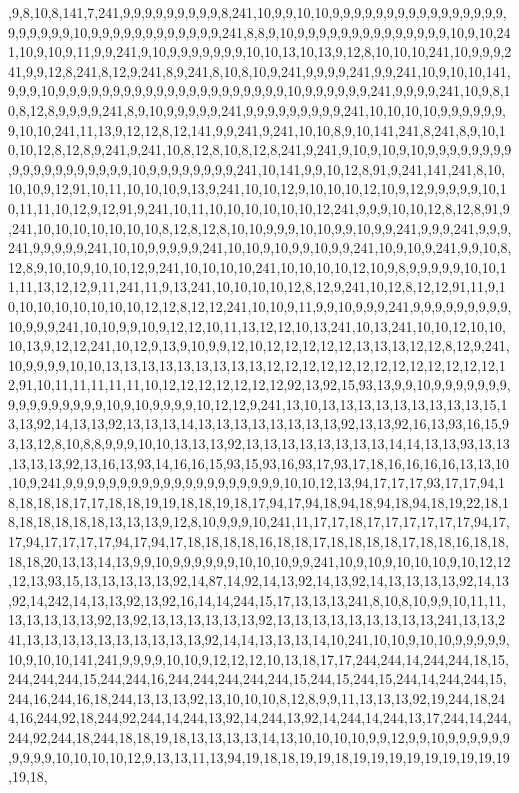 ,9,8,10,8,141,7,241,9,9,9,9,9,9,9,9,9,8,241,10,9,9,10,10,9,9,9,9,9,9,9,9,9,9,9,9,9,9,9,9,9,9,9,9,9,9,10,9,9,9,9,9,9,9,9,9,9,9,9,241,8,8,9,10,9,9,9,9,9,9,9,9,9,9,9,9,9,9,10,9,10,241,10,9,10,9,11,9,9,241,9,10,9,9,9,9,9,9,9,10,10,13,10,13,9,12,8,10,10,10,241,10,9,9,9,241,9,9,12,8,241,8,12,9,241,8,9,241,8,10,8,10,9,241,9,9,9,9,241,9,9,241,10,9,10,10,141,9,9,9,10,9,9,9,9,9,9,9,9,9,9,9,9,9,9,9,9,9,9,9,9,9,10,9,9,9,9,9,9,241,9,9,9,9,241,10,9,8,10,8,12,8,9,9,9,9,241,8,9,10,9,9,9,9,9,241,9,9,9,9,9,9,9,9,9,241,10,10,10,10,9,9,9,9,9,9,9,10,10,241,11,13,9,12,12,8,12,141,9,9,241,9,241,10,10,8,9,10,141,241,8,241,8,9,10,10,10,12,8,12,8,9,241,9,241,10,8,12,8,10,8,12,8,241,9,241,9,10,9,10,9,10,9,9,9,9,9,9,9,9,9,9,9,9,9,9,9,9,9,9,9,10,9,9,9,9,9,9,9,9,241,10,141,9,9,10,12,8,91,9,241,141,241,8,10,10,10,9,12,91,10,11,10,10,10,9,13,9,241,10,10,12,9,10,10,10,12,10,9,12,9,9,9,9,9,10,10,11,11,10,12,9,12,91,9,241,10,11,10,10,10,10,10,10,12,241,9,9,9,10,10,12,8,12,8,91,9,241,10,10,10,10,10,10,10,8,12,8,12,8,10,10,9,9,9,10,10,9,9,10,9,9,241,9,9,9,241,9,9,9,241,9,9,9,9,9,241,10,10,9,9,9,9,9,241,10,10,9,10,9,9,10,9,9,241,10,9,10,9,241,9,9,10,8,12,8,9,10,10,9,10,10,12,9,241,10,10,10,10,241,10,10,10,10,12,10,9,8,9,9,9,9,9,10,10,11,11,13,12,12,9,11,241,11,9,13,241,10,10,10,10,12,8,12,9,241,10,12,8,12,12,91,11,9,10,10,10,10,10,10,10,10,12,12,8,12,12,241,10,10,9,11,9,9,10,9,9,9,241,9,9,9,9,9,9,9,9,9,10,9,9,9,241,10,10,9,9,10,9,12,12,10,11,13,12,12,10,13,241,10,13,241,10,10,12,10,10,10,13,9,12,12,241,10,12,9,13,9,10,9,9,12,10,12,12,12,12,12,13,13,13,12,12,8,12,9,241,10,9,9,9,9,10,10,13,13,13,13,13,13,13,13,13,12,12,12,12,12,12,12,12,12,12,12,12,12,12,91,10,11,11,11,11,11,10,12,12,12,12,12,12,12,92,13,92,15,93,13,9,9,10,9,9,9,9,9,9,9,9,9,9,9,9,9,9,9,9,10,9,10,9,9,9,9,10,12,12,9,241,13,10,13,13,13,13,13,13,13,13,13,15,13,13,92,14,13,13,92,13,13,13,14,13,13,13,13,13,13,13,13,92,13,13,92,16,13,93,16,15,93,13,12,8,10,8,8,9,9,9,10,10,13,13,13,92,13,13,13,13,13,13,13,13,14,14,13,13,93,13,13,13,13,13,92,13,16,13,93,14,16,16,15,93,15,93,16,93,17,93,17,18,16,16,16,16,13,13,10,10,9,241,9,9,9,9,9,9,9,9,9,9,9,9,9,9,9,9,9,9,9,9,10,10,12,13,94,17,17,17,93,17,17,94,18,18,18,18,17,17,18,18,19,19,18,18,19,18,17,94,17,94,18,94,18,94,18,94,18,19,22,18,18,18,18,18,18,18,13,13,13,9,12,8,10,9,9,9,10,241,11,17,17,18,17,17,17,17,17,17,94,17,17,94,17,17,17,17,94,17,94,17,18,18,18,18,16,18,18,17,18,18,18,18,17,18,18,16,18,18,18,18,20,13,13,14,13,9,9,10,9,9,9,9,9,9,10,10,10,9,9,241,10,9,10,9,10,10,10,9,10,12,12,12,13,93,15,13,13,13,13,13,92,14,87,14,92,14,13,92,14,13,92,14,13,13,13,13,92,14,13,92,14,242,14,13,13,92,13,92,16,14,14,244,15,17,13,13,13,241,8,10,8,10,9,9,10,11,11,13,13,13,13,13,92,13,92,13,13,13,13,13,13,92,13,13,13,13,13,13,13,13,13,241,13,13,241,13,13,13,13,13,13,13,13,13,13,92,14,14,13,13,13,14,10,241,10,10,9,10,10,9,9,9,9,9,10,9,10,10,141,241,9,9,9,9,10,10,9,12,12,12,10,13,18,17,17,244,244,14,244,244,18,15,244,244,244,15,244,244,16,244,244,244,244,244,15,244,15,244,15,244,14,244,244,15,244,16,244,16,18,244,13,13,13,92,13,10,10,10,8,12,8,9,9,11,13,13,13,92,19,244,18,244,16,244,92,18,244,92,244,14,244,13,92,14,244,13,92,14,244,14,244,13,17,244,14,244,244,92,244,18,244,18,18,19,18,13,13,13,13,14,13,10,10,10,10,9,9,12,9,9,10,9,9,9,9,9,9,9,9,9,9,10,10,10,10,12,9,13,13,11,13,94,19,18,18,19,19,18,19,19,19,19,19,19,19,19,19,19,18,